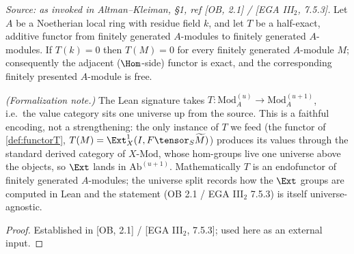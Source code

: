 \begin{theorem}
  \label{thm:ob_halfexact_free}
  \textit{Source: as invoked in Altman--Kleiman, §1, ref [OB, 2.1] / [EGA III$_2$, 7.5.3].}
  Let $A$ be a Noetherian local ring with residue field $k$, and let $T$ be a
  half-exact, additive functor from finitely generated $A$-modules to finitely
  generated $A$-modules. If $T(k) = 0$ then $T(M) = 0$ for every finitely
  generated $A$-module $M$; consequently the adjacent ($\Hom$-side) functor is
  exact, and the corresponding finitely presented $A$-module is free.

  \emph{(Formalization note.)} The Lean signature takes $T :
  \mathrm{Mod}_A^{(u)} \to \mathrm{Mod}_A^{(u+1)}$, i.e.\ the value category sits
  one universe up from the source. This is a faithful encoding, not a
  strengthening: the only instance of $T$ we feed (the functor of
  \cref{def:functorT}, $T(M) = \Ext^1_X(I, F\tensor_S\widetilde M)$) produces its
  values through the standard derived category of $X\text{-Mod}$, whose hom-groups
  live one universe above the objects, so $\Ext$ lands in $\mathrm{Ab}^{(u+1)}$.
  Mathematically $T$ is an endofunctor of finitely generated $A$-modules; the
  universe split records how the $\Ext$ groups are computed in Lean and the
  statement (OB 2.1 / EGA III$_2$ 7.5.3) is itself universe-agnostic.
  \begin{proof}
    Established in [OB, 2.1] / [EGA III$_2$, 7.5.3]; used here as an external input.
  \end{proof}
\end{theorem}


